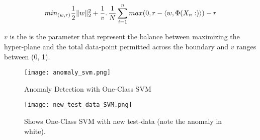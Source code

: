 \documentclass[a4paper, parskip=full]{scrartcl}
\begin{document}
\[min_{(w,r)}\frac{1}{2}\|w\|_2^2 + \dfrac{1}{v}\ldotp \dfrac{1}{N}\sum_{i =1}^{n}max (0,r -\langle w,\Phi(X_n:)\rangle) - r \]

$v$ is the is the parameter that represent the balance between maximizing the hyper-plane and the total data-point permitted across the boundary and $v$ ranges between (0, 1).


\newpage

\begin{figure}
	
	\centering
	\texttt{[image: anomaly\_svm.png]}
	\caption{Anomaly Detection with One-Class SVM }
	
\end{figure}

\begin{figure}
	\centering
	\texttt{[image: new\_test\_data\_SVM.png]}
	\caption{ Shows One-Class SVM with new test-data (note the anomaly in white).}
	
\end{figure}
\end{document}
